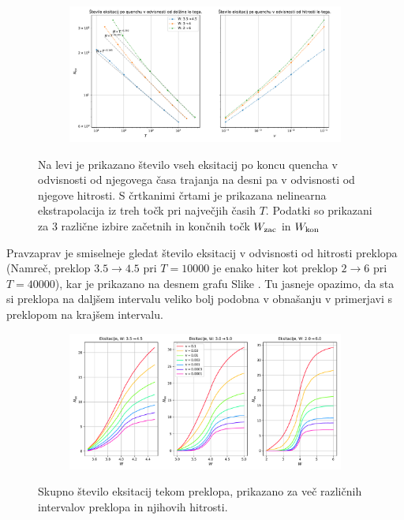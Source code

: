 \begin{figure}[H]
\centering
\begin{subfigure}{.99\textwidth}
\includegraphics[width=\linewidth]{Figures/Skaliranje3Alt.pdf}
\end{subfigure}
\caption{Na levi je prikazano število vseh eksitacij po koncu quencha v odvisnosti od njegovega časa trajanja na desni pa v odvisnosti od njegove hitrosti. S črtkanimi črtami je prikazana nelinearna ekstrapolacija iz treh točk pri največjih časih $T$. Podatki so prikazani za 3 različne izbire začetnih in končnih točk $W_{\textup{zac}}$ in $W_{\textup{kon}}$}
\label{fig:Skaliranje}
\end{figure}
Pravzaprav je smiselneje gledat število eksitacij v odvisnosti od hitrosti preklopa (Namreč, preklop $3.5 \rightarrow 4.5$ pri $T=10000$ je enako hiter kot preklop $2 \rightarrow 6$ pri $T=40000$), kar je prikazano na desnem grafu Slike \label{fig:Skaliranje}. Tu jasneje opazimo, da sta si preklopa na daljšem intervalu veliko bolj podobna v obnašanju v primerjavi s preklopom na krajšem intervalu. 
\begin{figure}[H]
\centering
\begin{subfigure}{.99\textwidth}
\includegraphics[width=\linewidth]{Figures/SkoziCas.pdf}
\end{subfigure}
\caption{Skupno število eksitacij tekom preklopa, prikazano za več različnih intervalov preklopa in njihovih hitrosti.}
\label{fig:SkoziCas}
\end{figure}

